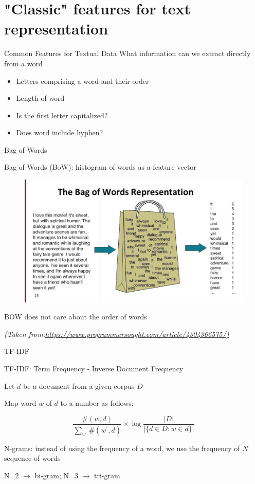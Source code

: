 \documentclass[12pt, handout]{beamer}
\begin{document}
\section{"Classic" features for text representation}

\begin{frame}{Common Features for Textual Data}
What information can  we extract directly from  a word

\begin{itemize}
	\item Letters comprising a word and their order
	\item Length of word
	\item Is the first letter capitalized?
	\item Does word include hyphen? 
\end{itemize}
	
\end{frame}
\begin{frame}{Bag-of-Words}

Bag-of-Words (BoW): histogram of words as a feature vector

		\begin{figure}
			\centering
			\includegraphics[scale=0.25]{./figure/bow.jpg}
		\end{figure}
BOW does not care about the order of words


\vspace*{\fill}
\textit{\tiny{(Taken from:\url{https://www.programmersought.com/article/4304366575/)}}}
\end{frame}

\begin{frame}{TF-IDF}

TF-IDF: Term Frequency - Inverse Document Frequency

Let $d$ be a document from a given corpus $D$

Map word $w$ of $d$ to a number as follows:
		
\begin{equation*}
\frac{\#(w,d)}{\sum_{w^\prime}  \#(w^\prime, d)} \times \log\frac{|D|}{|\{ d\in D: w \in d\}|}
\end{equation*}

N-grams: instead of using the frequency of a word, we use the frequency of $N$ sequence of words 

N=2 $\rightarrow$ bi-gram; N=3 $\rightarrow$ tri-gram
\end{frame}
\end{document}
